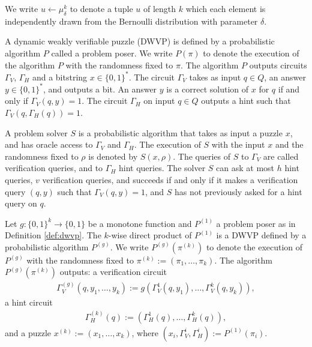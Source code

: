 We write $u \leftarrow \mu_{\delta}^k$ to denote a tuple $u$ of length $k$ which each element
is independently drawn from the Bernoulli distribution with parameter $\delta$.
%
\begin{definition}
  \label{def:dwvp}
  A dynamic weakly verifiable puzzle (DWVP) is defined by a probabilistic algorithm $P$
  called a problem poser.
  We write $P(\pi)$ to denote the execution of the algorithm $P$ with the randomness fixed to $\pi$.
  The algorithm $P$ outputs circuits $\Gamma_{V}$, $\Gamma_{H}$ and a bitstring $x \in \{0,1\}^{*}$.
  The circuit $\Gamma_{V}$ takes as input $q \in Q$, an answer $y \in \{0,1\}^*$,
  and outputs a bit. An answer $y$ is a correct solution of $x$ for $q$ if and only if $\Gamma_V(q,y) = 1$.
  The circuit $\Gamma_H$ on input $q \in Q$ outputs a hint such that $\Gamma_V(q,\Gamma_H(q)) = 1$.

  A problem solver $S$ is a probabilistic algorithm that takes as input a puzzle $x$,
  and has oracle access to $\Gamma_V$ and $\Gamma_H$.
  The execution of $S$ with the input $x$ and the randomness fixed to $\rho$
  is denoted by $S(x, \rho)$. The queries of $S$ to $\Gamma_V$ are called verification queries, and to $\Gamma_H$ hint queries.
  The solver $S$ can ask at most $h$ hint queries, $v$ verification queries, and succeeds if and only if
  it makes a verification query $(q,y)$ such that $\Gamma_V(q,y) = 1$, and $S$ has not previously asked for a hint query on $q$.
\end{definition}
%
\begin{definition}
  \label{def:kdwvp}
Let $g: \{0,1\}^{k} \rightarrow \{0,1\}$ be a monotone function and $P^{(1)}$ a problem poser as in Definition \ref{def:dwvp}.
The $k$-wise direct product of $P^{(1)}$ is a DWVP defined by a probabilistic algorithm $P^{(g)}$.
We write $P^{(g)}(\pi^{(k)})$ to denote the execution of $P^{(g)}$ with the randomness fixed to $\pi^{(k)} := (\pi_1, \dots, \pi_k)$.
The algorithm $P^{(g)}(\pi^{(k)})$ outputs:
a verification circuit
\begin{align*}
  \Gamma_V^{(g)} (q, y_1, \dots, y_k) := g(\Gamma_V^{1}(q, y_1), \dots, \Gamma_V^{k}(q, y_k)),
\end{align*}
a hint circuit
\begin{align*}
  \Gamma_H^{(k)} (q) := (\Gamma_H^{1}(q), \dots, \Gamma_H^{k}(q)),
\end{align*}
and a puzzle $x^{(k)} := (x_1, \dots, x_k)$, where $(x_i, \Gamma_V^{i}, \Gamma_H^{i} ) := P^{(1)}(\pi_i)$.
\end{definition}
